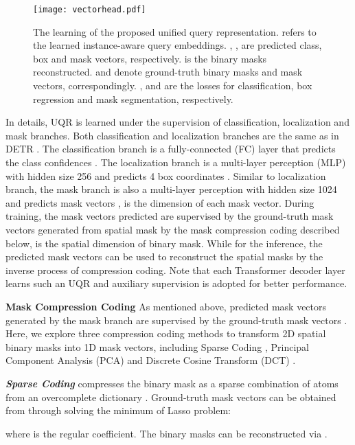 \documentclass{article}
\begin{document}
\begin{figure}[h]
\centering
\texttt{[image: vectorhead.pdf]}
\caption{The learning of the proposed unified query representation.  refers to the learned instance-aware query embeddings. , ,  are predicted class, box and mask vectors, respectively.  is the binary masks reconstructed.  and  denote ground-truth binary masks and mask vectors, correspondingly. ,  and  are the losses for classification, box regression and mask segmentation, respectively.}
\label{fig:vector_head}
\end{figure}

In details, UQR is learned under the supervision of classification, localization and mask branches. Both classification and localization branches are the same as in DETR \cite{carion2020detr}. The classification branch is a fully-connected (FC) layer that predicts the class confidences . The localization branch is a multi-layer perception (MLP) with hidden size 256 and predicts 4 box coordinates . Similar to localization branch, the mask branch is also a multi-layer perception with hidden size 1024 and predicts mask vectors ,  is the dimension of each mask vector. During training, the mask vectors predicted are supervised by the ground-truth mask vectors  generated from spatial mask  by the mask compression coding described below,  is the spatial dimension of binary mask. While for the inference, the predicted mask vectors  can be used to reconstruct the spatial masks  by the inverse process of compression coding. Note that each Transformer decoder layer learns such an UQR and auxiliary supervision is adopted for better performance. 




\textbf{Mask Compression Coding}
As mentioned above, predicted mask vectors  generated by the mask branch are supervised by the ground-truth mask vectors . Here, we explore three compression coding methods to transform 2D spatial binary masks into 1D mask vectors, including Sparse Coding \cite{donoho2006compressed}, Principal Component Analysis (PCA) \cite{wold1987principal} and Discrete Cosine Transform (DCT) \cite{ahmed1974discrete}. 


\textbf{\textit{Sparse Coding}} compresses the binary mask as a sparse combination of  atoms from an overcomplete dictionary . Ground-truth mask vectors  can be obtained from  through solving the minimum of Lasso \cite{tibshirani1996regression} problem:

where  is the regular coefficient. The binary masks  can be reconstructed via .
\end{document}
